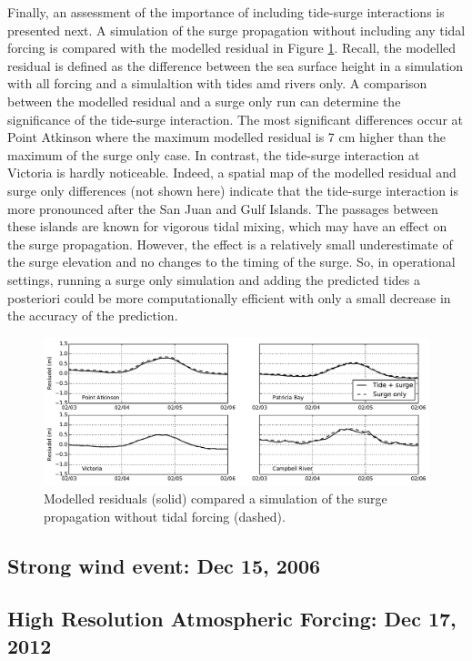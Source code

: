 \documentclass[pdftex,10pt]{article}
\begin{document}
Finally, an assessment of the importance of including tide-surge interactions is presented next. A simulation of the surge propagation without including any tidal forcing is compared with the modelled residual in Figure \ref{fig:tidesurge}. Recall, the modelled residual is defined as the difference between the sea surface height in a simulation with all forcing and a simulaltion with tides amd rivers only. A comparison between the modelled residual and a surge only run can determine the significance of the tide-surge interaction. The most significant differences occur at Point Atkinson where the maximum modelled residual is 7 cm higher than the maximum of the surge only case.  In contrast, the tide-surge interaction at Victoria is hardly noticeable. Indeed, a spatial map of the modelled residual and surge only differences (not shown here) indicate that the tide-surge interaction is more pronounced after the San Juan and Gulf Islands. The passages between these islands are known for vigorous tidal mixing, which may have an effect on the surge propagation. However, the effect is a relatively small underestimate of the surge elevation and no changes to the timing of the surge. So, in operational settings, running a surge only simulation and adding the predicted tides a posteriori could be more computationally efficient with only a small decrease in the accuracy of the prediction. 

\begin{figure}
\centering
\includegraphics[scale=0.6]{Figures/feb2006_tidesurge.pdf}
\caption{Modelled residuals (solid) compared a simulation of the surge propagation without tidal forcing (dashed).}
\label{fig:tidesurge}
\end{figure}

\subsection{Strong wind event: Dec 15, 2006}%

\subsection{High Resolution Atmospheric Forcing: Dec 17, 2012}
\end{document}
